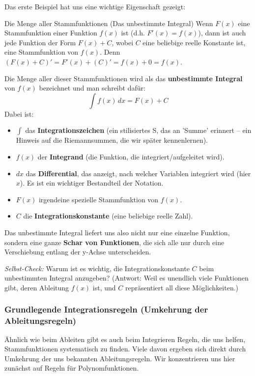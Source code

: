 Das erste Beispiel hat uns eine wichtige Eigenschaft gezeigt:

\begin{merksatzumgebung}{Die Menge aller Stammfunktionen (Das unbestimmte Integral)}
Wenn $F(x)$ eine Stammfunktion einer Funktion $f(x)$ ist (d.h. $F'(x)=f(x)$), dann ist auch jede Funktion der Form $F(x)+C$, wobei $C$ eine beliebige reelle Konstante ist, eine Stammfunktion von $f(x)$.
Denn $(F(x)+C)' = F'(x) + (C)' = f(x) + 0 = f(x)$.

Die Menge aller dieser Stammfunktionen wird als das \textbf{unbestimmte Integral} von $f(x)$ bezeichnet und man schreibt dafür:
\[ \int f(x) \,dx = F(x) + C \]
Dabei ist:
\begin{itemize}
    \item $\int$ das \textbf{Integrationszeichen} (ein stilisiertes S, das an 'Summe' erinnert – ein Hinweis auf die Riemannsummen, die wir später kennenlernen).
    \item $f(x)$ der \textbf{Integrand} (die Funktion, die integriert/aufgeleitet wird).
    \item $dx$ das \textbf{Differential}, das anzeigt, nach welcher Variablen integriert wird (hier $x$). Es ist ein wichtiger Bestandteil der Notation.
    \item $F(x)$ irgendeine spezielle Stammfunktion von $f(x)$.
    \item $C$ die \textbf{Integrationskonstante} (eine beliebige reelle Zahl).
\end{itemize}
Das unbestimmte Integral liefert uns also nicht nur eine einzelne Funktion, sondern eine ganze \textbf{Schar von Funktionen}, die sich alle nur durch eine Verschiebung entlang der y-Achse unterscheiden.
\end{merksatzumgebung}

\textit{Selbst-Check:} Warum ist es wichtig, die Integrationskonstante $C$ beim unbestimmten Integral anzugeben? (Antwort: Weil es unendlich viele Funktionen gibt, deren Ableitung $f(x)$ ist, und $C$ repräsentiert all diese Möglichkeiten.)

\subsubsection{Grundlegende Integrationsregeln (Umkehrung der Ableitungsregeln)}
Ähnlich wie beim Ableiten gibt es auch beim Integrieren Regeln, die uns helfen, Stammfunktionen systematisch zu finden. Viele davon ergeben sich direkt durch Umkehrung der uns bekannten Ableitungsregeln. Wir konzentrieren uns hier zunächst auf Regeln für Polynomfunktionen.

